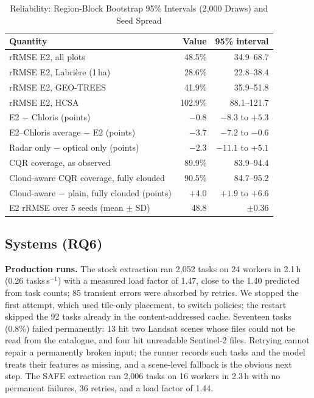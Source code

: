 \documentclass[conference,a4paper]{IEEEtran}
\begin{document}
\begin{table}[t]
\centering
\caption{Reliability: Region-Block Bootstrap 95\% Intervals (2{,}000 Draws) and Seed Spread}
\label{tab:reliab}
\footnotesize
\setlength{\tabcolsep}{3pt}
\begin{tabular}{@{}l r r@{}}
\toprule
\textbf{Quantity} & \textbf{Value} & \textbf{95\% interval}\\
\midrule
rRMSE E2, all plots & 48.5\% & 34.9--68.7\\
rRMSE E2, Labri\`ere (1\,ha) & 28.6\% & 22.8--38.4\\
rRMSE E2, GEO-TREES & 41.9\% & 35.9--51.8\\
rRMSE E2, HCSA & 102.9\% & 88.1--121.7\\
E2 $-$ Chloris (points) & $-0.8$ & $-8.3$ to $+5.3$\\
E2--Chloris average $-$ E2 (points) & $-3.7$ & $-7.2$ to $-0.6$\\
Radar only $-$ optical only (points) & $-2.3$ & $-11.1$ to $+5.1$\\
CQR coverage, as observed & 89.9\% & 83.9--94.4\\
Cloud-aware CQR coverage, fully clouded & 90.5\% & 84.7--95.2\\
Cloud-aware $-$ plain, fully clouded (points) & $+4.0$ & $+1.9$ to $+6.6$\\
\midrule
E2 rRMSE over 5 seeds (mean $\pm$ SD) & 48.8 & $\pm$0.36\\
\bottomrule
\end{tabular}
\end{table}

\subsection{Systems (RQ6)}
\textbf{Production runs.} The stock extraction ran 2{,}052 tasks on 24 workers in 2.1\,h (0.26 tasks\,s$^{-1}$) with a measured load factor of 1.47, close to the 1.40 predicted from task counts; 85 transient errors were absorbed by retries. We stopped the first attempt, which used tile-only placement, to switch policies; the restart skipped the 92 tasks already in the content-addressed cache. Seventeen tasks (0.8\%) failed permanently: 13 hit two Landsat scenes whose files could not be read from the catalogue, and four hit unreadable Sentinel-2 files. Retrying cannot repair a permanently broken input; the runner records such tasks and the model treats their features as missing, and a scene-level fallback is the obvious next step. The SAFE extraction ran 2{,}006 tasks on 16 workers in 2.3\,h with no permanent failures, 36 retries, and a load factor of 1.44.
\end{document}
